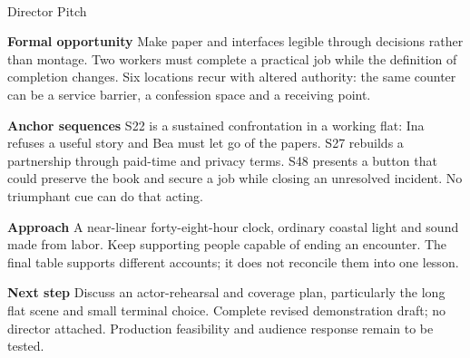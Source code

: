 \documentclass[11pt,letterpaper]{article}
\begin{document}
\begin{center}
{\Large\bfseries\sffamily \filmtitleupper}\\[6pt]
Director Pitch
\end{center}
\textbf{Formal opportunity} Make paper and interfaces legible through decisions rather than montage. Two workers must complete a practical job while the definition of completion changes. Six locations recur with altered authority: the same counter can be a service barrier, a confession space and a receiving point.

\textbf{Anchor sequences} S22 is a sustained confrontation in a working flat: Ina refuses a useful story and Bea must let go of the papers. S27 rebuilds a partnership through paid-time and privacy terms. S48 presents a button that could preserve the book and secure a job while closing an unresolved incident. No triumphant cue can do that acting.

\textbf{Approach} A near-linear forty-eight-hour clock, ordinary coastal light and sound made from labor. Keep supporting people capable of ending an encounter. The final table supports different accounts; it does not reconcile them into one lesson.

\textbf{Next step} Discuss an actor-rehearsal and coverage plan, particularly the long flat scene and small terminal choice. Complete revised demonstration draft; no director attached. Production feasibility and audience response remain to be tested.
\end{document}
